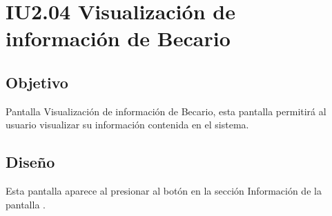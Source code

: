 \newpage
\section{IU2.04 Visualización de información de Becario}

\subsection{Objetivo}
	Pantalla Visualización de información de Becario, esta pantalla permitirá al usuario visualizar su información contenida en el sistema.
	


\subsection{Diseño}
	Esta pantalla aparece al presionar al botón  en la sección Información de la pantalla .

	
